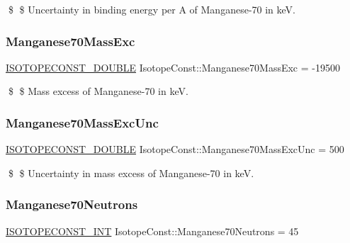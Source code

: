\$ \$ Uncertainty in binding energy per A of Manganese-\/70 in keV. \mbox{\label{group___isotope_const-_manganese-_mn70_ga5b114caaa3af30d5a571ec4d2749c8ff}} 
\subsubsection{\texorpdfstring{Manganese70\+Mass\+Exc}{Manganese70MassExc}}
{\footnotesize\ttfamily \mbox{\hyperlink{group___isotope_const-_macros_ga8f45a7272ce02c0b4c65c44636ed719a}{I\+S\+O\+T\+O\+P\+E\+C\+O\+N\+S\+T\+\_\+\+D\+O\+U\+B\+LE}} Isotope\+Const\+::\+Manganese70\+Mass\+Exc = -\/19500}

\$ \$ Mass excess of Manganese-\/70 in keV. \mbox{\label{group___isotope_const-_manganese-_mn70_gab768cffa43d153b3b45bc6aad781786b}} 
\subsubsection{\texorpdfstring{Manganese70\+Mass\+Exc\+Unc}{Manganese70MassExcUnc}}
{\footnotesize\ttfamily \mbox{\hyperlink{group___isotope_const-_macros_ga8f45a7272ce02c0b4c65c44636ed719a}{I\+S\+O\+T\+O\+P\+E\+C\+O\+N\+S\+T\+\_\+\+D\+O\+U\+B\+LE}} Isotope\+Const\+::\+Manganese70\+Mass\+Exc\+Unc = 500}

\$ \$ Uncertainty in mass excess of Manganese-\/70 in keV. \mbox{\label{group___isotope_const-_manganese-_mn70_gae1951fb9f5a34fa525a0959b9c404e7b}} 
\subsubsection{\texorpdfstring{Manganese70\+Neutrons}{Manganese70Neutrons}}
{\footnotesize\ttfamily \mbox{\hyperlink{group___isotope_const-_macros_ga5f18360b3e99483a35c32d789e62621c}{I\+S\+O\+T\+O\+P\+E\+C\+O\+N\+S\+T\+\_\+\+I\+NT}} Isotope\+Const\+::\+Manganese70\+Neutrons = 45}

